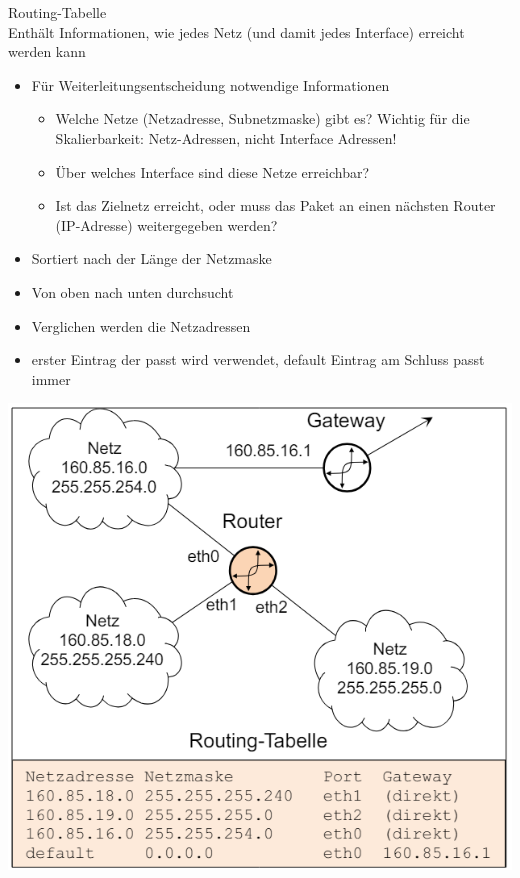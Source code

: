\begin{definition}{Routing-Tabelle}\\
    Enthält Informationen, wie jedes Netz (und damit jedes Interface) erreicht werden kann
    \begin{itemize}
        \item Für Weiterleitungsentscheidung notwendige Informationen
        \begin{itemize}
            \item Welche Netze (Netzadresse, Subnetzmaske) gibt es? Wichtig für die Skalierbarkeit: Netz-Adressen, nicht Interface Adressen!
            \item Über welches Interface sind diese Netze erreichbar?
            \item Ist das Zielnetz erreicht, oder muss das Paket an einen nächsten Router (IP-Adresse) weitergegeben werden?
        \end{itemize}
        \item Sortiert nach der Länge der Netzmaske
        \item Von oben nach unten durchsucht
        \item Verglichen werden die Netzadressen
        \item erster Eintrag der passt wird verwendet, default Eintrag am Schluss passt immer
    \end{itemize}
        \includegraphics[width=0.75\linewidth]{images/bsp_routing_tabelle.png}
\end{definition}

